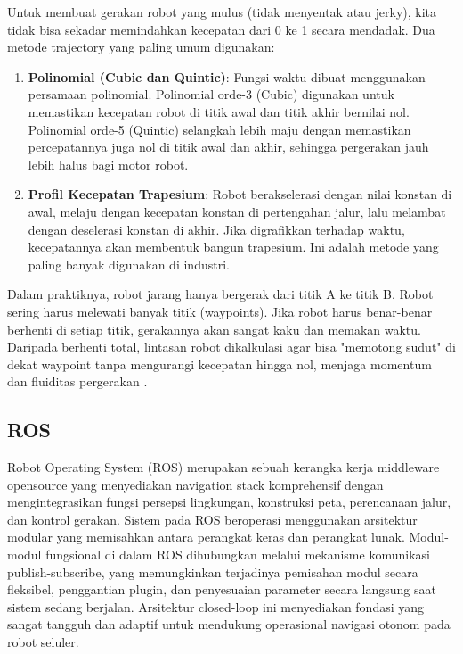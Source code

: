 Untuk membuat gerakan robot yang mulus (tidak menyentak atau jerky), kita tidak bisa sekadar memindahkan kecepatan dari 0 ke 1 secara mendadak. Dua metode trajectory yang paling umum digunakan:
\begin{enumerate}
  \item \textbf{Polinomial (Cubic dan Quintic)}: Fungsi waktu dibuat menggunakan persamaan polinomial. Polinomial orde-3 (Cubic) digunakan untuk memastikan kecepatan robot di titik awal dan titik akhir bernilai nol. Polinomial orde-5 (Quintic) selangkah lebih maju dengan memastikan percepatannya juga nol di titik awal dan akhir, sehingga pergerakan jauh lebih halus bagi motor robot.
  \item \textbf{Profil Kecepatan Trapesium}: Robot berakselerasi dengan nilai konstan di awal, melaju dengan kecepatan konstan di pertengahan jalur, lalu melambat dengan deselerasi konstan di akhir. Jika digrafikkan terhadap waktu, kecepatannya akan membentuk bangun trapesium. Ini adalah metode yang paling banyak digunakan di industri.
\end{enumerate}

Dalam praktiknya, robot jarang hanya bergerak dari titik A ke titik B. Robot sering harus melewati banyak titik (waypoints). Jika robot harus benar-benar berhenti di setiap titik, gerakannya akan sangat kaku dan memakan waktu. Daripada berhenti total, lintasan robot dikalkulasi agar bisa "memotong sudut" di dekat waypoint tanpa mengurangi kecepatan hingga nol, menjaga momentum dan fluiditas pergerakan \parencite{lynch2017modern}.

\subsection{ROS}

Robot Operating System (ROS) merupakan sebuah kerangka kerja middleware opensource yang menyediakan navigation stack komprehensif dengan mengintegrasikan fungsi persepsi lingkungan, konstruksi peta, perencanaan jalur, dan kontrol gerakan. Sistem pada ROS beroperasi menggunakan arsitektur modular yang memisahkan antara perangkat keras dan perangkat lunak. Modul-modul fungsional di dalam ROS dihubungkan melalui mekanisme komunikasi publish-subscribe, yang memungkinkan terjadinya pemisahan modul secara fleksibel, penggantian plugin, dan penyesuaian parameter secara langsung saat sistem sedang berjalan. Arsitektur closed-loop ini menyediakan fondasi yang sangat tangguh dan adaptif untuk mendukung operasional navigasi otonom pada robot seluler.

